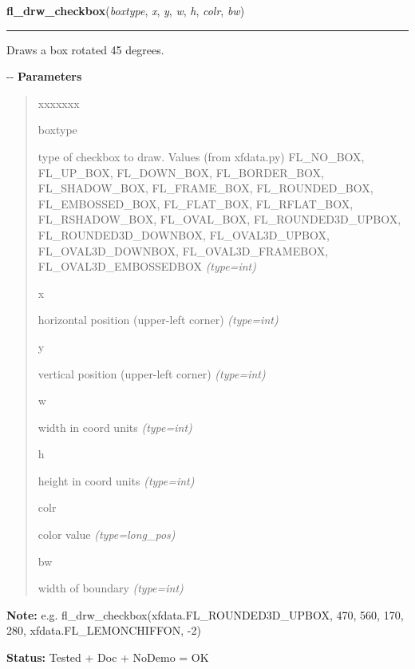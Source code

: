 \hspace{.8\funcindent}\begin{boxedminipage}{\funcwidth}

    \raggedright \textbf{fl\_drw\_checkbox}(\textit{boxtype}, \textit{x}, \textit{y}, \textit{w}, \textit{h}, \textit{colr}, \textit{bw})

    \vspace{-1.5ex}

    \rule{\textwidth}{0.5\fboxrule}
\setlength{\parskip}{2ex}

Draws a box rotated 45 degrees.

-{}-
\setlength{\parskip}{1ex}
      \textbf{Parameters}
      \vspace{-1ex}

      \begin{quote}
        \begin{Ventry}{xxxxxxx}

          \item[boxtype]


type of checkbox to draw. Values (from xfdata.py) FL\_NO\_BOX,
FL\_UP\_BOX, FL\_DOWN\_BOX, FL\_BORDER\_BOX, FL\_SHADOW\_BOX, FL\_FRAME\_BOX,
FL\_ROUNDED\_BOX, FL\_EMBOSSED\_BOX, FL\_FLAT\_BOX, FL\_RFLAT\_BOX,
FL\_RSHADOW\_BOX, FL\_OVAL\_BOX, FL\_ROUNDED3D\_UPBOX,
FL\_ROUNDED3D\_DOWNBOX, FL\_OVAL3D\_UPBOX, FL\_OVAL3D\_DOWNBOX,
FL\_OVAL3D\_FRAMEBOX, FL\_OVAL3D\_EMBOSSEDBOX
            {\it (type=int)}

          \item[x]


horizontal position (upper-left corner)
            {\it (type=int)}

          \item[y]


vertical position (upper-left corner)
            {\it (type=int)}

          \item[w]


width in coord units
            {\it (type=int)}

          \item[h]


height in coord units
            {\it (type=int)}

          \item[colr]


color value
            {\it (type=long\_pos)}

          \item[bw]


width of boundary
            {\it (type=int)}

        \end{Ventry}

      \end{quote}

\textbf{Note:} 
e.g. fl\_drw\_checkbox(xfdata.FL\_ROUNDED3D\_UPBOX, 470, 560, 170,
280, xfdata.FL\_LEMONCHIFFON, -2)


\textbf{Status:} 
Tested + Doc + NoDemo = OK


    \end{boxedminipage}

